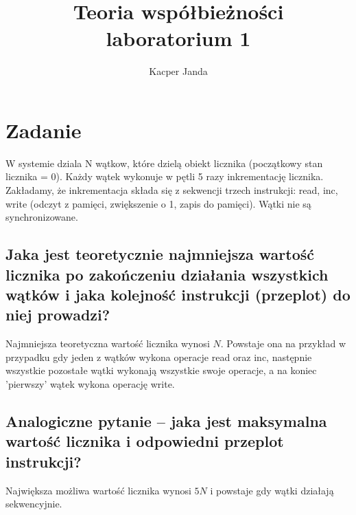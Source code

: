 \documentclass[11pt, a4paper]{article}
\begin{document}
\title{Teoria współbieżności\\laboratorium 1}
\author{Kacper Janda}
\date{}
\maketitle

\section{Zadanie}
W systemie dziala N wątkow, które dzielą obiekt licznika (początkowy stan licznika = 0). Każdy wątek wykonuje w pętli 5 razy inkrementację licznika. Zakładamy, że inkrementacja składa się z sekwencji trzech instrukcji: read, inc, write (odczyt z pamięci, zwiększenie o 1, zapis do pamięci). Wątki nie są synchronizowane.

\subsection{Jaka jest teoretycznie najmniejsza wartość licznika po zakończeniu działania wszystkich wątków i jaka kolejność instrukcji (przeplot) do niej prowadzi?}
Najmniejsza teoretyczna wartość licznika wynosi \begin{math} N \end{math}. Powstaje ona na przykład w przypadku gdy jeden z wątków wykona operacje read oraz inc, następnie wszystkie pozostałe wątki wykonają wszystkie swoje operacje, a na koniec 'pierwszy' wątek wykona operację write.

\subsection{Analogiczne pytanie -- jaka jest maksymalna wartość licznika i odpowiedni przeplot instrukcji?}
Największa możliwa wartość licznika wynosi \begin{math} 5N \end{math} i powstaje gdy wątki działają sekwencyjnie.
\end{document}
